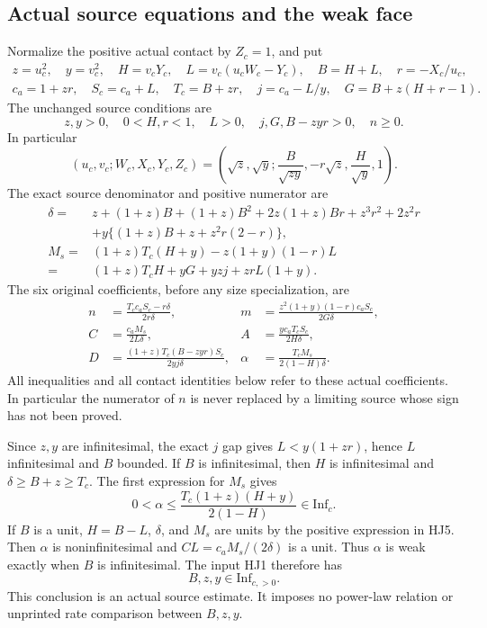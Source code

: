 \subsection{Actual source equations and the weak face}

Normalize the positive actual contact by \(Z_c=1\), and put
\[
\begin{gathered}
 z=u_c^2,\quad y=v_c^2,\quad H=v_cY_c,\quad
 L=v_c(u_cW_c-Y_c),\quad B=H+L,\quad r=-X_c/u_c,\\
 c_a=1+zr,\quad S_c=c_a+L,\quad T_c=B+zr,\quad
 j=c_a-L/y,\quad G=B+z(H+r-1).
\end{gathered}
\tag{HJ4}
\]
The unchanged source conditions are
\[
 z,y>0,\quad 0<H,r<1,\quad L>0,\quad
 j,G,B-zyr>0,\quad n\geq0 .
\]
In particular
\[
 (u_c,v_c;W_c,X_c,Y_c,Z_c)
 =\left(\sqrt z,\sqrt y;\frac{B}{\sqrt{zy}},
                  -r\sqrt z,\frac H{\sqrt y},1\right).
\]
The exact source denominator and positive numerator are
\[
\begin{split}
 \delta={}&z+(1+z)B+(1+z)B^2+2z(1+z)Br
                       +z^3r^2+2z^2r\\
 &+y\{(1+z)B+z+z^2r(2-r)\},\\
 M_s={}&(1+z)T_c(H+y)-z(1+y)(1-r)L\\
     ={}&(1+z)T_cH+yG+yzj+zrL(1+y).
\end{split}
\tag{HJ5}
\]
The six original coefficients, before any size specialization, are
\[
\begin{aligned}
 n&=\frac{T_cc_aS_c-r\delta}{2r\delta},&
 m&=\frac{z^2(1+y)(1-r)c_aS_c}{2G\delta},\\
 C&=\frac{c_aM_s}{2L\delta},&
 A&=\frac{yc_aT_cS_c}{2H\delta},\\
 D&=\frac{(1+z)T_c(B-zyr)S_c}{2yj\delta},&
 \alpha&=\frac{T_cM_s}{2(1-H)\delta}.
\end{aligned}
\tag{HJ6}
\]
All inequalities and all contact identities below refer
to these actual coefficients.  In particular the
numerator of \(n\) is never replaced by a limiting
source whose sign has not been proved.

Since \(z,y\) are infinitesimal, the exact \(j\) gap gives
\(L<y(1+zr)\), hence \(L\) infinitesimal and \(B\)
bounded.  If \(B\) is infinitesimal, then \(H\) is
infinitesimal and \(\delta\geq B+z\geq T_c\).
The first expression for \(M_s\) gives
\[
 0<\alpha
 \leq\frac{T_c(1+z)(H+y)}{2(1-H)}
 \in\mathrm{Inf}_c.
 \tag{HJ7}
\]
If \(B\) is a unit, \(H=B-L\), \(\delta\), and \(M_s\)
are units by the positive expression in HJ5.
Then \(\alpha\) is noninfinitesimal and
\(CL=c_aM_s/(2\delta)\) is a unit.
Thus \(\alpha\) is weak exactly when \(B\) is
infinitesimal.  The input HJ1 therefore has
\[
 B,z,y\in\mathrm{Inf}_{c,>0}.
 \tag{HJ8}
\]
This conclusion is an actual source estimate.
It imposes no power-law relation or unprinted rate
comparison between \(B,z,y\).


